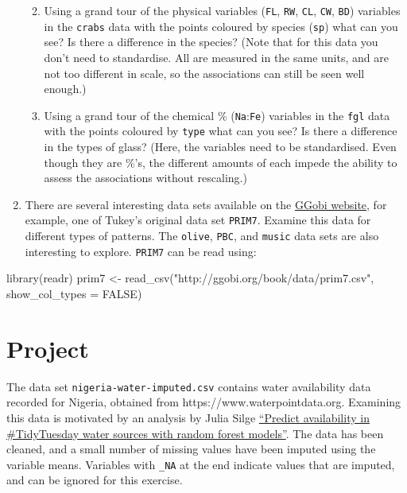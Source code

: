 \documentclass[
  letterpaper,
]{krantz}
\newenvironment{Shaded}{\begin{snugshade}}{\end{snugshade}}
\newcommand{\AttributeTok}[1]{\textcolor[rgb]{0.40,0.45,0.13}{#1}}
\newcommand{\ConstantTok}[1]{\textcolor[rgb]{0.56,0.35,0.01}{#1}}
\newcommand{\FunctionTok}[1]{\textcolor[rgb]{0.28,0.35,0.67}{#1}}
\newcommand{\NormalTok}[1]{\textcolor[rgb]{0.00,0.23,0.31}{#1}}
\newcommand{\OtherTok}[1]{\textcolor[rgb]{0.00,0.23,0.31}{#1}}
\newcommand{\StringTok}[1]{\textcolor[rgb]{0.13,0.47,0.30}{#1}}
\providecommand{\tightlist}{%
  \setlength{\itemsep}{0pt}\setlength{\parskip}{0pt}}\usepackage{longtable,booktabs,array}
\begin{document}
\begin{enumerate}
  \begin{enumerate}
  \def\labelenumii{\alph{enumii}.}
  \tightlist
  \item
    Using a grand tour of the physical variables (\texttt{FL},
    \texttt{RW}, \texttt{CL}, \texttt{CW}, \texttt{BD}) variables in the
    \texttt{crabs} data with the points coloured by species
    (\texttt{sp}) what can you see? Is there a difference in the
    species? (Note that for this data you don't need to standardise. All
    are measured in the same units, and are not too different in scale,
    so the associations can still be seen well enough.)
  \item
    Using a grand tour of the chemical \% (\texttt{Na}:\texttt{Fe})
    variables in the \texttt{fgl} data with the points coloured by
    \texttt{type} what can you see? Is there a difference in the types
    of glass? (Here, the variables need to be standardised. Even though
    they are \%'s, the different amounts of each impede the ability to
    assess the associations without rescaling.)
  \end{enumerate}
\item
  There are several interesting data sets available on the
  \href{http://ggobi.org/book/index.html}{GGobi website}, for example,
  one of Tukey's original data set \texttt{PRIM7}. Examine this data for
  different types of patterns. The \texttt{olive}, \texttt{PBC}, and
  \texttt{music} data sets are also interesting to explore.
  \texttt{PRIM7} can be read using:
\end{enumerate}

\begin{Shaded}
\begin{Highlighting}[]
\FunctionTok{library}\NormalTok{(readr)}
\NormalTok{prim7 }\OtherTok{\textless{}{-}} \FunctionTok{read\_csv}\NormalTok{(}\StringTok{"http://ggobi.org/book/data/prim7.csv"}\NormalTok{,}
                  \AttributeTok{show\_col\_types =} \ConstantTok{FALSE}\NormalTok{)}
\end{Highlighting}
\end{Shaded}

\section*{Project}\label{project}


The data set \texttt{nigeria-water-imputed.csv} contains water
availability data recorded for Nigeria, obtained from
https://www.waterpointdata.org. Examining this data is motivated by an
analysis by Julia Silge
\href{https://juliasilge.com/blog/water-sources/}{``Predict availability
in \#TidyTuesday water sources with random forest models''}. The data
has been cleaned, and a small number of missing values have been imputed
using the variable means. Variables with \texttt{\_NA} at the end
indicate values that are imputed, and can be ignored for this exercise.
\end{document}
